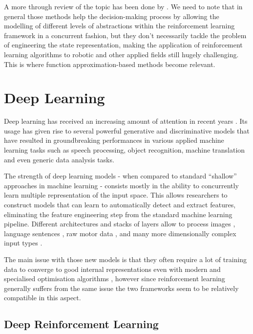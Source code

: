 
A more through review of the topic has been done by \cite{barto2003recent}. We
need to note that in general those methods help the decision-making process by
allowing the modelling of different levels of abstractions within the
reinforcement learning framework in a concurrent fashion, but they don't
necessarily tackle the problem of engineering the state representation, making
the application of reinforcement learning algorithms to robotic and other
applied fields still hugely challenging. This is where function
approximation-based methods become relevant.

\section{Deep Learning}

Deep learning has received an increasing amount of attention in recent years
\citep{lecun2015deep}. Its usage has given rise to several powerful generative
and discriminative models that have resulted in groundbreaking performances in
various applied machine learning tasks such as speech processing, object
recognition, machine translation and even generic data analysis tasks.

The strength of deep learning models - when compared to standard ``shallow''
approaches in machine learning - consists mostly in the ability to concurrently
learn multiple representation of the input space. This allows researchers to
construct models that can learn to automatically detect and extract features,
eliminating the feature engineering step from the standard machine learning
pipeline. Different architectures and stacks of layers allow to process images
\citep{krizhevsky2012imagenet}, language sentences \citep{collobert2011natural},
raw motor data \citep{levine2015learning}, and many more dimensionally complex
input types \citep{karpathy2014deep, chen2014convolutional, lenz2015deep,
  graves2014neural}.

The main issue with those new models is that they often require a lot of
training data to converge to good internal representations even with modern and
specialised optimisation algorithms \citep{glorot2010understanding}, however
since reinforcement learning generally suffers from the same issue the two
frameworks seem to be relatively compatible in this aspect.

\subsection{Deep Reinforcement Learning}

